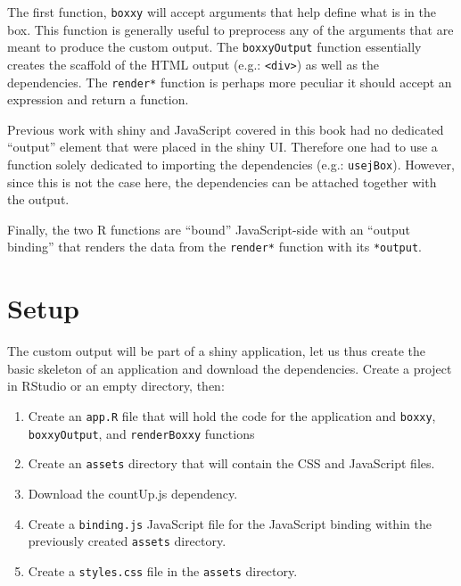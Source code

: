 \documentclass[
  10pt,
]{krantz}
\providecommand{\tightlist}{%
  \setlength{\itemsep}{0pt}\setlength{\parskip}{0pt}}
\begin{document}
The first function, \texttt{boxxy} will accept arguments that help define what is in the box. This function is generally useful to preprocess any of the arguments that are meant to produce the custom output. The \texttt{boxxyOutput} function essentially creates the scaffold of the HTML output (e.g.: \texttt{\textless{}div\textgreater{}}) as well as the dependencies. The \texttt{render*} function is perhaps more peculiar it should accept an expression and return a function.

Previous work with shiny and JavaScript covered in this book had no dedicated ``output'' element that were placed in the shiny UI. Therefore one had to use a function solely dedicated to importing the dependencies (e.g.: \texttt{usejBox}). However, since this is not the case here, the dependencies can be attached together with the output.

Finally, the two R functions are ``bound'' JavaScript-side with an ``output binding'' that renders the data from the \texttt{render*} function with its \texttt{*output}.

\hypertarget{shiny-output-setup}{%
\section{Setup}\label{shiny-output-setup}}

The custom output will be part of a shiny application, let us thus create the basic skeleton of an application and download the dependencies. Create a project in RStudio or an empty directory, then:

\begin{enumerate}
\def\labelenumi{\arabic{enumi}.}
\tightlist
\item
  Create an \texttt{app.R} file that will hold the code for the application and \texttt{boxxy}, \texttt{boxxyOutput}, and \texttt{renderBoxxy} functions
\item
  Create an \texttt{assets} directory that will contain the CSS and JavaScript files.
\item
  Download the countUp.js dependency.
\item
  Create a \texttt{binding.js} JavaScript file for the JavaScript binding within the previously created \texttt{assets} directory.
\item
  Create a \texttt{styles.css} file in the \texttt{assets} directory.
\end{enumerate}
\end{document}
